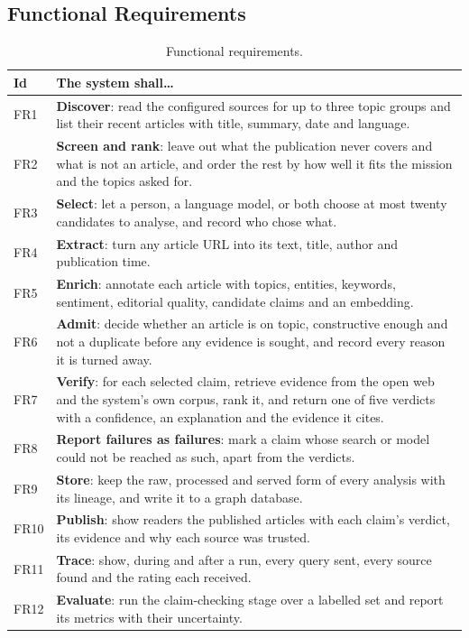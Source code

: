 
\subsection{Functional Requirements}

\begin{table}[ht]
\centering
\small
\caption{Functional requirements.}
\label{tab:functional-requirements}
\begin{tabularx}{\linewidth}{@{}lX@{}}
\toprule
\textbf{Id} & \textbf{The system shall\ldots} \\
\midrule
FR1 & \textbf{Discover}: read the configured sources for up to three
topic groups and list their recent articles with title, summary,
date and language. \\
FR2 & \textbf{Screen and rank}: leave out what the publication never
covers and what is not an article, and order the rest by how well it
fits the mission and the topics asked for. \\
FR3 & \textbf{Select}: let a person, a language model, or both choose
at most twenty candidates to analyse, and record who chose what. \\
FR4 & \textbf{Extract}: turn any article URL into its text, title,
author and publication time. \\
FR5 & \textbf{Enrich}: annotate each article with topics, entities,
keywords, sentiment, editorial quality, candidate claims and an
embedding. \\
FR6 & \textbf{Admit}: decide whether an article is on topic,
constructive enough and not a duplicate before any evidence is sought,
and record every reason it is turned away. \\
FR7 & \textbf{Verify}: for each selected claim, retrieve evidence from
the open web and the system's own corpus, rank it, and return one of
five verdicts with a confidence, an explanation and the evidence it
cites. \\
FR8 & \textbf{Report failures as failures}: mark a claim whose search
or model could not be reached as such, apart from the verdicts. \\
FR9 & \textbf{Store}: keep the raw, processed and served form of every
analysis with its lineage, and write it to a graph database. \\
FR10 & \textbf{Publish}: show readers the published articles with each
claim's verdict, its evidence and why each source was trusted. \\
FR11 & \textbf{Trace}: show, during and after a run, every query sent,
every source found and the rating each received. \\
FR12 & \textbf{Evaluate}: run the claim-checking stage over a labelled
set and report its metrics with their uncertainty. \\
\bottomrule
\end{tabularx}
\end{table}
